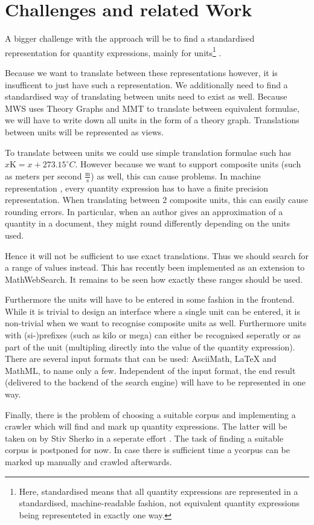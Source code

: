 \documentclass[11pt]{article}
\begin{document}
\section{Challenges and related Work}
\label{sec:problems_relatedwork}


A bigger challenge with the approach will be to find a standardised representation for quantity expressions, mainly for units\footnote{Here, standardised means that all quantity expressions are represented in a standardised, machine-readable fashion, not equivalent quantity expressions being representeted in exactly one way. } .

Because we want to translate between these representations however, it is insufficent to just have such a representation. We additionally need to find a standardised way of translating between units need to exist as well. Because MWS uses Theory Graphs and MMT to translate between equivalent formulae, we will have to write down all units in the form of a theory graph. Translations between units will be represented as views.

To translate between units we could use simple translation formulae such has $x \text{K} = x + 273.15 ^\circ{C} $. However because we want to support composite units (such as meters per second $\frac{\text{m}}{\text{s}}$) as well, this can cause problems. In machine representation , every quantity expression has to have a finite precision representation. When translating between 2 composite units, this can easily cause rounding errors. In particular, when an author gives an approximation of a quantity in a document, they might round differently depending on the units used.

Hence it will not be sufficient to use exact translations. Thus we should search for a range of values instead. This has recently been implemented as an extension to MathWebSearch\cite{MWS:Ranges}. It remains to be seen how exactly these ranges should be used.

Furthermore the units will have to be entered in some fashion  in the frontend. While it is trivial to design an interface where a single unit can be entered, it is non-trivial when we want to recognise composite units as well. Furthermore units with (si-)prefixes (such as kilo or mega) can either be recognised seperatly or as part of the unit (multipling directly into the value of the quantity expression). There are several input formats that can be used: AsciiMath, \LaTeX{} and MathML, to name only a few. Independent of the input format, the end result (delivered to the backend of the search engine) will have to be represented in one way.

Finally, there is the problem of choosing a suitable corpus and implementing a crawler which will find and mark up quantity expressions. The latter will be taken on by Stiv Sherko in a seperate effort \cite{proposal:sharko}. The task of finding a suitable corpus is postponed for now. In case there is sufficient time a ycorpus can be marked up manually and crawled afterwards.

{}
\end{document}
